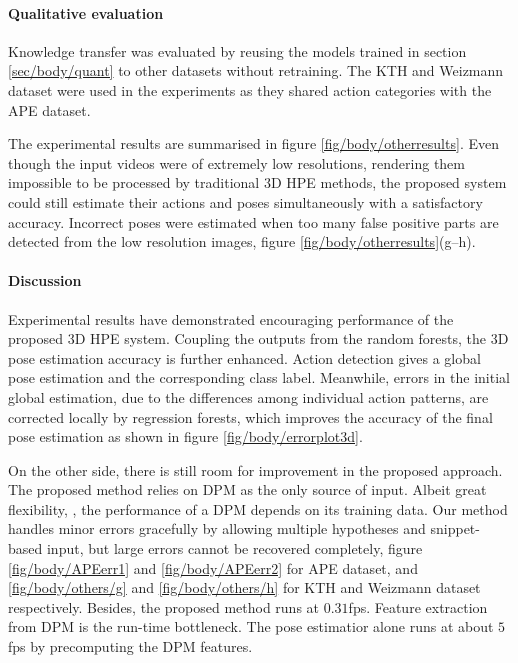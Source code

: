 

\paragraph{Qualitative evaluation}

Knowledge transfer was evaluated by reusing the models trained in section \ref{sec/body/quant} to other datasets without retraining.
The KTH \cite{Schuldt2004} and Weizmann \cite{Gorelick2007} dataset were used in the experiments as they shared action categories with the APE dataset. 

The experimental results are summarised in figure \ref{fig/body/otherresults}. Even though the input videos were of extremely low resolutions, rendering them impossible to be processed by traditional 3D HPE methods, the proposed system could still estimate their actions and poses simultaneously with a satisfactory accuracy. 
Incorrect poses were estimated when too many false positive parts are detected from the low resolution images, \eg figure \ref{fig/body/otherresults}(g--h). 

\paragraph{Discussion}
Experimental results have demonstrated encouraging performance of the proposed 3D HPE system.  
Coupling the outputs from the random forests, the 3D pose estimation accuracy is further enhanced. Action detection gives a global pose estimation and the corresponding class label. Meanwhile, errors in the initial global estimation, due to the differences among individual action patterns, are corrected locally by regression forests, which improves the accuracy of the final pose estimation as shown in figure \ref{fig/body/errorplot3d}. 

On the other side, there is still room for improvement in the proposed approach. The proposed method relies on DPM as the only source of input. Albeit great flexibility, \cf \cite{Yang2011}, the performance of a DPM depends on its training data. Our method handles minor errors gracefully by allowing multiple hypotheses and snippet-based input, but large errors cannot be recovered completely, \eg figure \ref{fig/body/APEerr1} and \ref{fig/body/APEerr2} for APE dataset, and \ref{fig/body/others/g} and \ref{fig/body/others/h} for KTH and Weizmann dataset respectively. 
Besides, the proposed method runs at $0.31$fps. Feature extraction from DPM is the run-time bottleneck. The pose estimatior alone runs at about $5$fps by precomputing the DPM features. 

